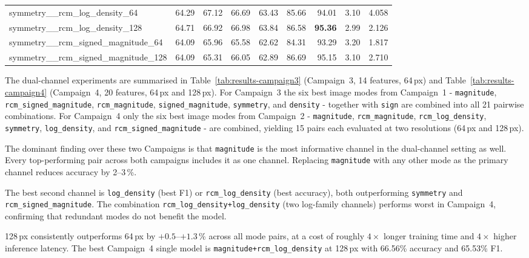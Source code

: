 \begin{table}[H]
{\begin{tabular}{lrrrrrrrr}
    symmetry\_\_rcm\_log\_density\_64                 & 64.29 & 67.12 & 66.69 & 63.43 & 85.66 & 94.01 & 3.10 & 4.058 \\
    symmetry\_\_rcm\_log\_density\_128                & 64.71 & 66.92 & 66.98 & 63.84 & 86.58 & \textbf{95.36} & 2.99 & 2.126 \\
    symmetry\_\_rcm\_signed\_magnitude\_64            & 64.09 & 65.96 & 65.58 & 62.62 & 84.31 & 93.29 & 3.20 & 1.817 \\
    symmetry\_\_rcm\_signed\_magnitude\_128           & 64.09 & 65.31 & 66.05 & 62.89 & 86.69 & 95.15 & 3.10 & 2.710 \\
    \bottomrule
  \end{tabular}%
  }
\end{table}

The dual-channel experiments are summarised in Table~\ref{tab:results-campaign3} (Campaign~3, 14 features, 64\,px)
and Table~\ref{tab:results-campaign4} (Campaign~4, 20 features, 64\,px and 128\,px).
For Campaign~3 the six best image modes from Campaign~1 - \texttt{magnitude}, \texttt{rcm\_signed\_magnitude},
\texttt{rcm\_magnitude}, \texttt{signed\_magnitude}, \texttt{symmetry}, and \texttt{density} -
together with \texttt{sign} are combined into all 21 pairwise combinations.
For Campaign~4 only the six best image modes from Campaign~2 - \texttt{magnitude}, \texttt{rcm\_magnitude},
\texttt{rcm\_log\_density}, \texttt{symmetry}, \texttt{log\_density}, and \texttt{rcm\_signed\_magnitude} - are combined,
yielding 15 pairs each evaluated at two resolutions (64\,px and 128\,px).

The dominant finding over these two Campaigns is that \texttt{magnitude} is the most informative channel in the dual-channel setting as well.
Every top-performing pair across both campaigns includes it as one channel.
Replacing \texttt{magnitude} with any other mode as the primary channel reduces accuracy by 2--3\,\%.

The best second channel is \texttt{log\_density} (best F1) or \texttt{rcm\_log\_density}
(best accuracy), both outperforming \texttt{symmetry} and \texttt{rcm\_signed\_magnitude}.
The combination \texttt{rcm\_log\_density+log\_density} (two log-family channels) performs
worst in Campaign~4, confirming that redundant modes do not benefit the model.

128\,px consistently outperforms 64\,px by $+0.5$--$+1.3$\,\% across all mode pairs,
at a cost of roughly $4\times$ longer training time and $4\times$ higher inference latency.
The best Campaign~4 single model is \texttt{magnitude+rcm\_log\_density} at 128\,px
with 66.56\% accuracy and 65.53\% F1.

